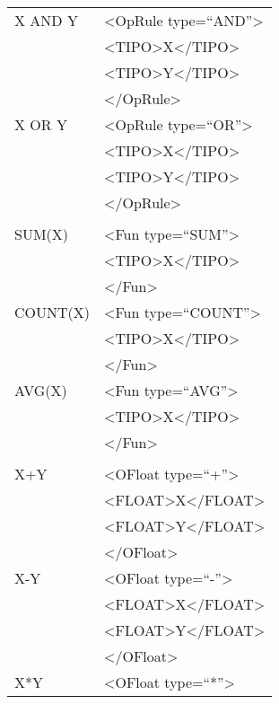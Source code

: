 \begin{table}[htbp]
\begin{tabular}{||p{3cm}||p{6.5cm}||}
\hline
X AND Y & \textless OpRule type=``AND''\textgreater \\
& \textless TIPO\textgreater X\textless /TIPO\textgreater \\
& \textless TIPO\textgreater Y\textless /TIPO\textgreater \\
& \textless /OpRule\textgreater \\ \hline
X OR Y & \textless OpRule type=``OR''\textgreater \\
& \textless TIPO\textgreater X\textless /TIPO\textgreater \\
& \textless TIPO\textgreater Y\textless /TIPO\textgreater \\
& \textless /OpRule\textgreater \\ \hline
& \\ \hline
SUM(X) & \textless Fun type=``SUM''\textgreater\\ 
& \textless TIPO\textgreater X\textless /TIPO\textgreater \\
& \textless /Fun\textgreater \\ \hline
COUNT(X) & \textless Fun type=``COUNT''\textgreater\\ 
& \textless TIPO\textgreater X\textless /TIPO\textgreater \\
& \textless /Fun\textgreater \\ \hline
AVG(X) & \textless Fun type=``AVG''\textgreater\\ 
& \textless TIPO\textgreater X\textless /TIPO\textgreater \\
& \textless /Fun\textgreater \\ \hline
& \\ \hline
X+Y & \textless OFloat type=``+''\textgreater\\
& \textless FLOAT\textgreater X\textless /FLOAT\textgreater \\
& \textless FLOAT\textgreater Y\textless /FLOAT\textgreater \\
& \textless /OFloat\textgreater \\ \hline
X-Y & \textless OFloat type=``-''\textgreater\\
& \textless FLOAT\textgreater X\textless /FLOAT\textgreater \\
& \textless FLOAT\textgreater Y\textless /FLOAT\textgreater \\
& \textless /OFloat\textgreater \\ \hline
X*Y & \textless OFloat type=``*''\textgreater\\

\end{tabular}
\end{table}
